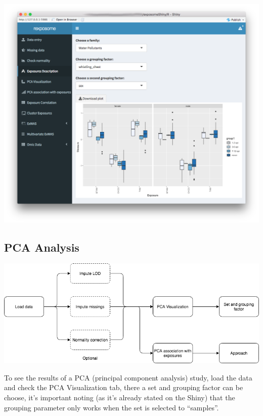 \documentclass[
]{book}
\begin{document}
\includegraphics{images/analysis4_2.png}

\hypertarget{pca-analysis}{%
\subsection{PCA Analysis}\label{pca-analysis}}

\includegraphics{images/analysis5_1.png}

To see the results of a PCA (principal component analysis) study, load the data and check the PCA Visualization tab, there a set and grouping factor can be choose, it's important noting (as it's already stated on the Shiny) that the grouping parameter only works when the set is selected to ``samples''.
\end{document}

